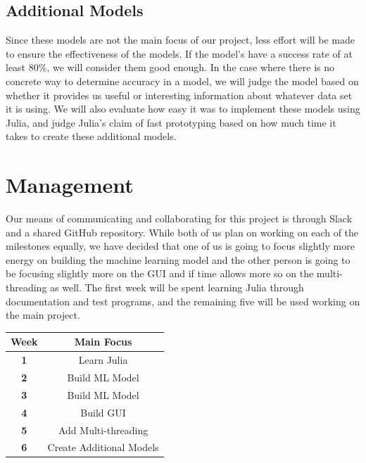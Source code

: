 \documentclass{article}
\begin{document}
\subsection{Additional Models}
Since these models are not the main focus of our project, less effort will be made to ensure the effectiveness of the models. If the model's have a success rate of at least 80\%, we will consider them good enough. In the case where there is no concrete way to determine accuracy in a model, we will judge the model based on whether it provides us useful or interesting information about whatever data set it is using. We will also evaluate how easy it was to implement these models using Julia, and judge Julia's claim of fast prototyping based on how much time it takes to create these additional models.

\section{Management}
Our means of communicating and collaborating for this project is through Slack and a shared GitHub repository. While both of us plan on working on each of the milestones equally, we have decided that one of us is going to focus slightly more energy on building the machine learning model and the other person is going to be focusing slightly more on the GUI and if time allows more so on the multi-threading as well. The first week will be spent learning Julia through documentation and test programs, and the remaining five will be used working on the main project.

\begin{table}[ht]
\centering
\begin{tabular}{c|c}
\hline
\textbf{Week} & \textbf{Main Focus}\\
\hline
\textbf{1} & Learn Julia \\
\textbf{2} & Build ML Model \\
\textbf{3} & Build ML Model \\
\textbf{4} & Build GUI \\
\textbf{5} & Add Multi-threading \\
\textbf{6} & Create Additional Models \\
\end{tabular}
\end{table}



\end{document}
